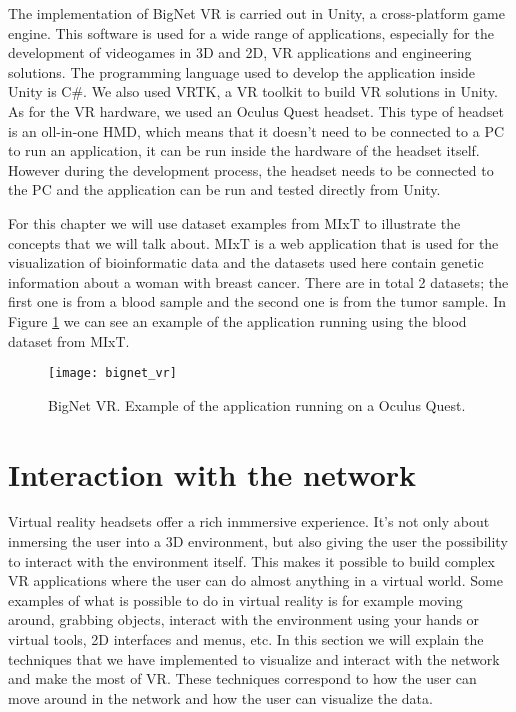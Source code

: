 The implementation of BigNet VR is carried out in Unity, a cross-platform game engine. This software is used for a wide range of applications, especially for the development of videogames in 3D and 2D, VR applications and engineering solutions. The programming language used to develop the application inside Unity is C\#. We also used VRTK, a VR toolkit to build VR solutions in Unity. As for the VR hardware, we used an Oculus Quest headset. This type of headset is an oll-in-one HMD, which means that it doesn't need to be connected to a PC to run an application, it can be run inside the hardware of the headset itself. However during the development process, the headset needs to be connected to the PC and the application can be run and tested directly from Unity.

For this chapter we will use dataset examples from MIxT to illustrate the concepts that we will talk about. MIxT is a web application that is used for the visualization of bioinformatic data\cite{fjukstad_dumeaux_olsen_lund_hallett_bongo_2017}\cite{dumeaux_fjukstad_interactions_tumor_blood} and the datasets used here contain genetic information about a woman with breast cancer. There are in total 2 datasets; the first one is from a blood sample and the second one is from the tumor sample. In Figure \ref{fig:bignet_vr} we can see an example of the application running using the blood dataset from MIxT.

\begin{figure}[h!]
    \setlength{\tempheight}{15ex}
    \centering
    \texttt{[image: bignet\_vr]}
    \caption{BigNet VR. Example of the application running on a Oculus Quest.}
    \label{fig:bignet_vr}
\end{figure}

\section{Interaction with the network}
Virtual reality headsets offer a rich inmmersive experience. It's not only about inmersing the user into a 3D environment, but also giving the user the possibility to interact with the environment itself. This makes it possible to build complex VR applications where the user can do almost anything in a virtual world. Some examples of what is possible to do in virtual reality is for example moving around, grabbing objects, interact with the environment using your hands or virtual tools, 2D interfaces and menus, etc. In this section we will explain the techniques that we have implemented to visualize and interact with the network and make the most of VR. These techniques correspond to how the user can move around in the network and how the user can visualize the data.

